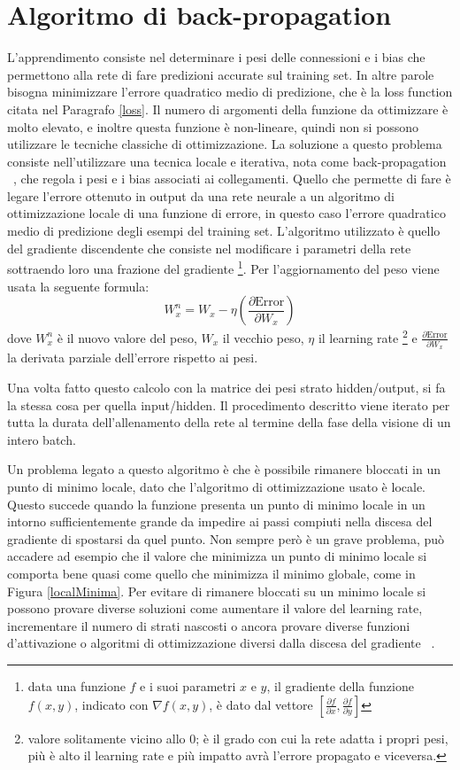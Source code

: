\documentclass[12pt]{report}
\begin{document}
\section{Algoritmo di back-propagation}\label{backprop}
L'apprendimento consiste nel determinare i pesi delle connessioni e i bias che permettono alla rete di fare predizioni accurate sul training set. In altre parole bisogna minimizzare l'errore quadratico medio di predizione, che è la loss function citata nel Paragrafo \ref{loss}.
Il numero di argomenti della funzione da ottimizzare è molto elevato, e inoltre questa funzione è non-lineare, quindi non si possono utilizzare le tecniche classiche di ottimizzazione. La soluzione a questo problema consiste nell'utilizzare una tecnica locale e iterativa, nota come back-propagation ~\cite{Backpropagation}, che regola i pesi e i bias associati ai collegamenti. Quello che permette di fare è legare l'errore ottenuto in output da una rete neurale a un algoritmo di ottimizzazione locale di una funzione di errore, in questo caso l'errore quadratico medio di predizione degli esempi del training set. L'algoritmo utilizzato è quello del gradiente discendente che consiste nel modificare i parametri della rete sottraendo loro una frazione del gradiente \footnote{data una funzione $f$ e i suoi parametri $x$ e $y$, il gradiente della funzione $f(x, y)$, indicato con $\nabla f(x, y)$, è dato dal vettore $[\frac{\partial f}{\partial x}, \frac{\partial f}{\partial y}]$}.
Per l'aggiornamento del peso viene usata la seguente formula:
$$W^n_x = W_x - \eta \left(\frac{\partial \mathrm{Error}}{\partial W_x}\right)$$ dove $W^n_x$ è il nuovo valore del peso, $W_x$ il vecchio peso, $\eta$ il learning rate \footnote{valore solitamente vicino allo 0; è il grado con cui la rete adatta i propri pesi, più è alto il learning rate e più impatto avrà l'errore propagato e viceversa.} e $\frac{\partial \mathrm{Error}}{\partial W_x}$ la derivata parziale dell'errore rispetto ai pesi. 

Una volta fatto questo calcolo con la matrice dei pesi strato hidden/output, si fa la stessa cosa per quella input/hidden. Il procedimento descritto viene iterato per tutta la durata dell'allenamento della rete al termine della fase della visione di un intero batch.

Un problema legato a questo algoritmo è che è possibile rimanere bloccati in un punto di minimo locale, dato che l'algoritmo di ottimizzazione usato è locale. Questo succede quando la funzione presenta un punto di minimo locale in un intorno sufficientemente grande da impedire ai passi compiuti nella discesa del gradiente di spostarsi da quel punto. Non sempre però è un grave problema, può accadere ad esempio che il valore che minimizza un punto di minimo locale si comporta bene quasi come quello che minimizza il minimo globale, come in Figura \ref{localMinima}. Per evitare di rimanere bloccati su un minimo locale si possono provare diverse soluzioni come aumentare il valore del learning rate, incrementare il numero di strati nascosti o ancora provare diverse funzioni d'attivazione o algoritmi di ottimizzazione diversi dalla discesa del gradiente ~\cite{LocalMinima}.
\end{document}
